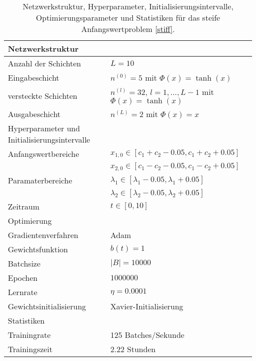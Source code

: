 \begin{table}
       \renewcommand{\arraystretch}{1.0}
       \centering
       \begin{tabular}{ l | l }
              \hline
              Netzwerkstruktur & \\
              \hline
              Anzahl der Schichten & $L=10$ \\
              Eingabeschicht & $n^{(0)}=5$ mit $\Phi(x)=\tanh(x)$ \\
              versteckte Schichten & $n^{(l)}=32$, $l = 1, \dots, L-1$ mit $\Phi(x)=\tanh(x)$ \\
              Ausgabeschicht & $n^{(L)}=2$ mit $\Phi(x)=x$ \\
              \hline
              Hyperparameter und Initialisierungsintervalle & \\
              \hline
              Anfangswertbereiche &
              $x_{1,0} \in [c_1+c_2 - 0.05, c_1+c_2 + 0.05]$ \\
              & $x_{2,0} \in [c_1-c_2 - 0.05, c_1-c_2 + 0.05]$ \\
              Paramaterbereiche &
              $\lambda_1 \in [\lambda_1 - 0.05, \lambda_1 + 0.05]$ \\
              & $\lambda_2 \in[\lambda_2 - 0.05, \lambda_2 + 0.05]$ \\
              Zeitraum & $t \in [0, 10]$ \\
              \hline
              Optimierung & \\
              \hline
              Gradientenverfahren & Adam \\
              Gewichtsfunktion & $b(t)=1$ \\
              Batchsize & $|B|=10000$ \\
              Epochen & $1000000$ \\
              Lernrate & $\eta= 0.0001$ \\
              Gewichtsinitialisierung & Xavier-Initialisierung \\
              \hline
              Statistiken & \\
              \hline
              Trainingrate & 125 Batches/Sekunde \\
              Trainingszeit & 2.22 Stunden \\
              \hline
       \end{tabular}
       \caption{Netzwerkstruktur, Hyperparameter, Initialisierungsintervalle, Optimierungsparameter und Statistiken
       für das steife Anfangswertproblem \eqref{stiff}.}
       \label{stiff-table}
\end{table}
